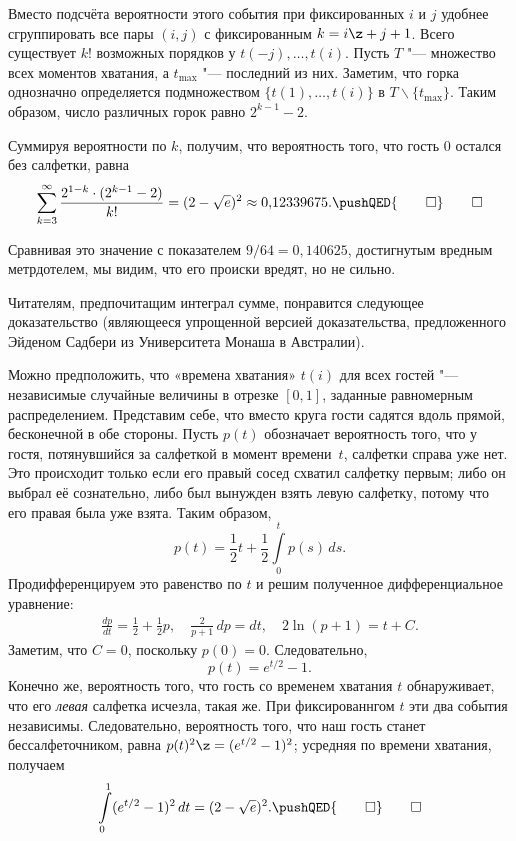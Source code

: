 \documentclass[twoside]{book}
\begin{document}
Вместо подсчёта вероятности этого события при фиксированных $i$ и $j$
удобнее сгруппировать все пары $(i, j)$ с фиксированным $k=i\z+j+1$.
Всего существует $k!$ возможных порядков у $t(-j),\dots, t (i)$.
Пусть $T$ "--- множество всех моментов хватания, а $t_{{\max}}$ "---
последний из них.
Заметим, что горка однозначно определяется
подмножеством $\{t(1),\dots,t(i)\}$ в $T\backslash \{t_{{\max}}\}$.
Таким образом, число различных горок равно $2^{k-1}-2$.

Суммируя вероятности по $k$, получим, что вероятность того, что гость 0 остался без салфетки, равна
\[\sum_{k=3}^\infty\frac{2^{1-k}\cdot(2^{k-1}-2)}{k!}=(2-\sqrt{e})^2\approx
0{,}12339675. 
\pushQED{\qed}\qedhere
\]

Сравнивая это значение с показателем $9/64 = 0{,}140625$, достигнутым
вредным метрдотелем, мы видим, что его происки вредят, но не сильно.

\medskip

Читателям, предпочитащим интеграл сумме, понравится следующее
доказательство (являющееся упрощенной версией доказательства,
предложенного Эйденом Садбери из Университета Монаша в Австралии).

\medskip

Можно предположить, что «времена хватания» $t(i)$ для всех гостей "--- независимые случайные величины в отрезке $[0,1]$, заданные равномерным распределением.
Представим себе, что вместо круга гости садятся вдоль прямой, бесконечной в обе стороны.
Пусть $p(t)$ обозначает вероятность того, что у гостя, потянувшийся за
салфеткой в момент времени~$t$, салфетки справа уже нет.
Это происходит только если его правый сосед схватил салфетку первым;
либо он выбрал её сознательно,
либо был вынужден взять левую салфетку, потому что его правая была уже взята.
Таким образом,
\[p(t)=\frac12t+\frac12\int\limits_0^tp(s)\,ds.\]
Продифференцируем это равенство по $t$ и решим полученное
дифференциальное уравнение: 
\begin{gather*}
\frac{dp}{dt}=\frac12+\frac12p,
\quad
\frac2{p+1}\,dp=dt,
\quad
2\ln(p+1)=t+C.
\end{gather*}
Заметим, что $C=0$, поскольку $p(0)=0$.
Следовательно,
\[
p(t) = e^{t/2} - 1.
\]
Конечно же, вероятность того, что гость со временем хватания $t$
обнаруживает, что его \emph{левая} салфетка исчезла, такая же.
При
фиксированнгом $t$ эти два события независимы.
Следовательно,
вероятность того, что наш гость станет бессалфеточником, равна $p(t)^2
\z= (e^{t/2} -1)^2$; усредняя по времени хватания, получаем
\[\int\limits_0^1(e^{t/2}-1)^2\,dt=(2-\sqrt{e})^2.
\pushQED{\qed}\qedhere
\]
\end{document}
